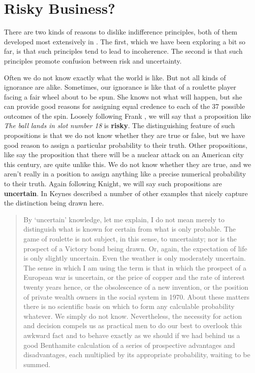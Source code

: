 \section{Risky Business?}

There are two kinds of reasons to dislike indifference principles, both of them developed most extensively in \citet{Keynes1921}. The first, which we have been exploring a bit so far, is that such principles tend to lead to incoherence. The second is that such principles promote confusion between risk and uncertainty.

Often we do not know exactly what the world is like. But not all kinds of ignorance are alike. Sometimes, our ignorance is like that of a roulette player facing a fair wheel about to be spun. She knows not what will happen, but she can provide good reasons for assigning equal credence to each of the 37 possible outcomes of the spin. Loosely following Frank \citet{Knight1921}, we will say that a proposition like \textit{The ball lands in slot number 18} is \textbf{risky}. The distinguishing feature of such propositions is that we do not know whether they are true or false, but we have good reason to assign a particular probability to their truth. Other propositions, like say the proposition that there will be a nuclear attack on an American city this century, are quite unlike this. We do not know whether they are true, and we aren't really in a position to assign anything like a precise numerical probability to their truth. Again following Knight, we will say such propositions are \textbf{uncertain}. In \citeyearpar{Keynes1937} Keynes described a number of other examples that nicely capture the distinction being drawn here.

\begin{quote}
By `uncertain' knowledge, let me explain, I do not mean merely to distinguish what is known for certain from what is only probable. The game of roulette is not subject, in this sense, to uncertainty; nor is the prospect of a Victory bond being drawn. Or, again, the expectation of life is only slightly uncertain. Even the weather is only moderately uncertain. The sense in which I am using the term is that in which the prospect of a European war is uncertain, or the price of copper and the rate of interest twenty years hence, or the obsolescence of a new invention, or the position of private wealth owners in the social system in 1970. About these matters there is no scientific basis on which to form any calculable probability whatever. We simply do not know. Nevertheless, the necessity for action and decision compels us as practical men to do our best to overlook this awkward fact and to behave exactly as we should if we had behind us a good Benthamite calculation of a series of prospective advantages and disadvantages, each multiplied by its appropriate probability, waiting to be summed. \cite[114-115]{Keynes1937}
\end{quote}

